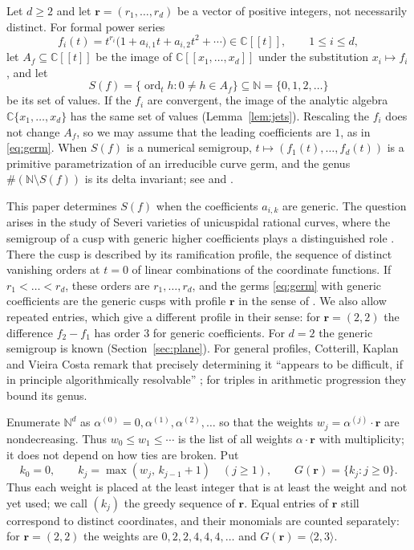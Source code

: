 \documentclass{amsart}
\theoremstyle{definition}
\numberwithin{equation}{section}
\newcommand{\N}{\mathbb{N}}
\newcommand{\C}{\mathbb{C}}
\newcommand{\bfr}{\mathbf{r}}
\newcommand{\ord}{\operatorname{ord}}
\newcommand{\gen}[1]{\langle #1\rangle}
\begin{document}
Let $d\ge2$ and let $\bfr=(r_1,\dots,r_d)$ be a vector of positive integers,
not necessarily distinct. For formal power series
\begin{equation}\label{eq:germ}
  f_i(t)=t^{r_i}\bigl(1+a_{i,1}t+a_{i,2}t^2+\cdots\bigr)\in\C[[t]],
  \qquad 1\le i\le d,
\end{equation}
let $A_f\subseteq\C[[t]]$ be the image of $\C[[x_1,\dots,x_d]]$ under the
substitution $x_i\mapsto f_i$, and let
\[
  S(f)=\{\ord_t h: 0\ne h\in A_f\}\subseteq\N=\{0,1,2,\dots\}
\]
be its set of values. If the $f_i$ are convergent, the image of the analytic
algebra $\C\{x_1,\dots,x_d\}$ has the same set of values (Lemma~\ref{lem:jets}).
Rescaling the $f_i$ does not change $A_f$, so we may assume that the leading
coefficients are $1$, as in \eqref{eq:germ}. When $S(f)$ is a
numerical semigroup, $t\mapsto(f_1(t),\dots,f_d(t))$ is a primitive
parametrization of an irreducible curve germ, and the genus
$\#(\N\setminus S(f))$ is its delta invariant; see
\cite[Section~1.1]{CLM} and \cite[Section~1.2]{CKV}.

This paper determines $S(f)$ when the coefficients $a_{i,k}$ are generic. The
question arises in the study of Severi varieties of unicuspidal rational
curves, where the semigroup of a cusp with generic higher coefficients plays a
distinguished role \cite{CLM,CKV}. There the cusp is described by its
ramification profile, the sequence of distinct vanishing orders at $t=0$ of
linear combinations of the coordinate functions. If $r_1<\dots<r_d$, these
orders are $r_1,\dots,r_d$, and the germs \eqref{eq:germ} with generic
coefficients are the generic cusps with profile $\bfr$ in the sense of
\cite{CLM,CKV}. We also allow repeated entries, which give a different profile
in their sense: for $\bfr=(2,2)$ the difference $f_2-f_1$ has order $3$ for
generic coefficients. For $d=2$ the generic semigroup is known
(Section~\ref{sec:plane}). For general profiles, Cotterill, Kaplan and Vieira
Costa remark that precisely determining it ``appears to be difficult, if in
principle algorithmically resolvable'' \cite[Section~1.1]{CKV}; for triples in
arithmetic progression they bound its genus.

Enumerate $\N^d$ as $\alpha^{(0)}=0,\alpha^{(1)},\alpha^{(2)},\dots$ so that the
weights $w_j=\alpha^{(j)}\cdot\bfr$ are nondecreasing. Thus $w_0\le w_1\le\cdots$
is the list of all weights $\alpha\cdot\bfr$ with multiplicity; it does not
depend on how ties are broken. Put
\begin{equation}\label{eq:G}
  k_0=0,\qquad k_j=\max(w_j,\,k_{j-1}+1)\quad(j\ge1),\qquad
  G(\bfr)=\{k_j: j\ge0\}.
\end{equation}
Thus each weight is placed at the least integer that is at least the weight
and not yet used; we call $(k_j)$ the greedy sequence of $\bfr$. Equal entries
of $\bfr$ still correspond to distinct coordinates, and their monomials are
counted separately: for $\bfr=(2,2)$ the weights are $0,2,2,4,4,4,\dots$ and
$G(\bfr)=\gen{2,3}$.
\end{document}

